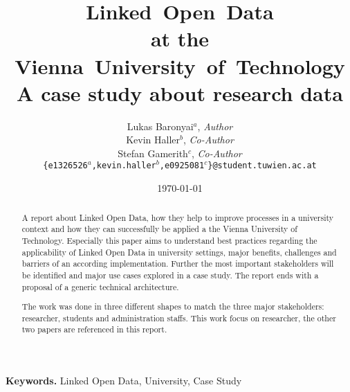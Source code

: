 \documentclass[pdftex,a4paper,10pt]{article}
\begin{document}
\pagestyle{plain}
\setlength{\tabcolsep}{10pt}
\title{\textbf{L}inked~\textbf{O}pen~\textbf{D}ata\\
	   at the\\
	   Vienna~University~of~Technology\\
	   \large A case study about research data}
\author{Lukas Baronyai$^a$, \textit{Author}\\
		Kevin Haller$^b$, \textit{Co-Author}\\
		Stefan Gamerith$^c$, \textit{Co-Author}\\
	\texttt{\{e1326526$^a$,kevin.haller$^b$,e0925081$^c$\}@student.tuwien.ac.at}}
\date{\today}

\maketitle

\begin{abstract}
A report about Linked Open Data, how they help to improve processes in a university context and how they can successfully be applied a the Vienna University of Technology. Especially this paper aims to understand best practices regarding the applicability of Linked Open Data in university settings, major benefits, challenges and barriers of an according implementation. Further the most important stakeholders will be identified and major use cases explored in a case study. The report ends with a proposal of a generic technical architecture.

The work was done in three different shapes to match the three major stakeholders: researcher, students and administration staffs. This work focus on researcher, the other two papers are referenced in this report.
\end{abstract}

\vfill
\begin{center}
\textbf{Keywords.} Linked Open Data, University, Case Study
\end{center}

\newpage
\tableofcontents
\listoffigures
{}






%
\end{document}
